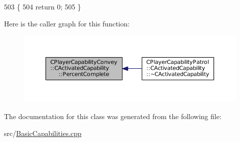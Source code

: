 \begin{DoxyCode}
503                                                                        \{
504     \textcolor{keywordflow}{return} 0;
505 \}
\end{DoxyCode}
Here is the caller graph for this function\+:\nopagebreak
\begin{figure}[H]
\begin{center}
\leavevmode
\includegraphics[width=350pt]{classCPlayerCapabilityConvey_1_1CActivatedCapability_aec6b75fc004f4ac18755d8f601c8ffca_icgraph}
\end{center}
\end{figure}


The documentation for this class was generated from the following file\+:\begin{DoxyCompactItemize}
\item 
src/\hyperlink{BasicCapabilities_8cpp}{Basic\+Capabilities.\+cpp}\end{DoxyCompactItemize}
